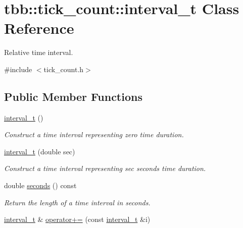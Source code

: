 \hypertarget{classtbb_1_1tick__count_1_1interval__t}{}\section{tbb\+:\+:tick\+\_\+count\+:\+:interval\+\_\+t Class Reference}
\label{classtbb_1_1tick__count_1_1interval__t}


Relative time interval.  




{\ttfamily \#include $<$tick\+\_\+count.\+h$>$}

\subsection*{Public Member Functions}
\begin{DoxyCompactItemize}
\item 
\hypertarget{classtbb_1_1tick__count_1_1interval__t_a95e3e14750bebafe719856176e2737db}{}\hyperlink{classtbb_1_1tick__count_1_1interval__t_a95e3e14750bebafe719856176e2737db}{interval\+\_\+t} ()\label{classtbb_1_1tick__count_1_1interval__t_a95e3e14750bebafe719856176e2737db}

\begin{DoxyCompactList}\small\item\em Construct a time interval representing zero time duration. \end{DoxyCompactList}\item 
\hypertarget{classtbb_1_1tick__count_1_1interval__t_a73b462297173f6bffa15bc5a86c30ef4}{}\hyperlink{classtbb_1_1tick__count_1_1interval__t_a73b462297173f6bffa15bc5a86c30ef4}{interval\+\_\+t} (double sec)\label{classtbb_1_1tick__count_1_1interval__t_a73b462297173f6bffa15bc5a86c30ef4}

\begin{DoxyCompactList}\small\item\em Construct a time interval representing sec seconds time duration. \end{DoxyCompactList}\item 
\hypertarget{classtbb_1_1tick__count_1_1interval__t_abe81446bbbb6b6e98d854b91acf47809}{}double \hyperlink{classtbb_1_1tick__count_1_1interval__t_abe81446bbbb6b6e98d854b91acf47809}{seconds} () const \label{classtbb_1_1tick__count_1_1interval__t_abe81446bbbb6b6e98d854b91acf47809}

\begin{DoxyCompactList}\small\item\em Return the length of a time interval in seconds. \end{DoxyCompactList}\item 
\hypertarget{classtbb_1_1tick__count_1_1interval__t_a19bf32f4541252daaa6b09fd33fa9177}{}\hyperlink{classtbb_1_1tick__count_1_1interval__t}{interval\+\_\+t} \& \hyperlink{classtbb_1_1tick__count_1_1interval__t_a19bf32f4541252daaa6b09fd33fa9177}{operator+=} (const \hyperlink{classtbb_1_1tick__count_1_1interval__t}{interval\+\_\+t} \&i)\label{classtbb_1_1tick__count_1_1interval__t_a19bf32f4541252daaa6b09fd33fa9177}


\end{DoxyCompactItemize}
